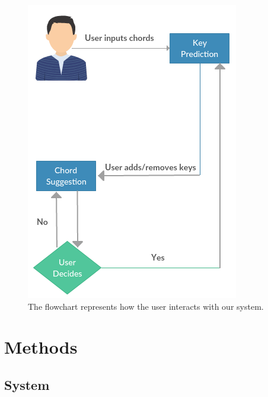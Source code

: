 \documentclass[letterpaper]{article}
\begin{document}
\begin{figure}[t]
	\centering
	\includegraphics[width = \columnwidth]{flowchart.png}
	\caption{The flowchart represents how the user interacts with our system.}
	\label{flowchart} 
\end{figure} 

\section{Methods}
\subsection{System}
\end{document}
